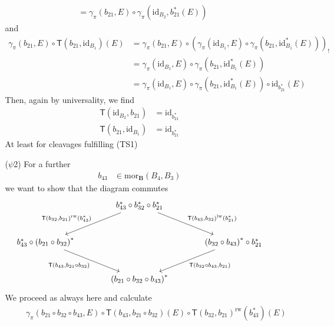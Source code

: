 \begin{enumerate}
\begin{enumerate}
\begin{align*}
  &=
  \gamma_{\pi}(b_{21},E)
  \circ
  \gamma_{\pi}(\mathrm{id}_{B_{2}},b_{21}^{\ast}(E))
\end{align*}
and
\begin{align*}
  \gamma_{\pi}(b_{21},E)
  \circ
  \mathsf{T}(b_{21},\mathrm{id}_{B_{1}})(E)
  &=
  \gamma_{\pi}(b_{21},E)
  \circ
  \left(
    \gamma_{\pi}(\mathrm{id}_{B_{1}},E)
    \circ
    \gamma_{\pi}(b_{21},\mathrm{id}_{B_{1}}^{\ast}(E))
  \right)_{!}
  \\
  &=
  \gamma_{\pi}(\mathrm{id}_{B_{1}},E)
  \circ
  \gamma_{\pi}(b_{21},\mathrm{id}_{B_{1}}^{\ast}(E))
  \\
  &=
  \gamma_{\pi}(\mathrm{id}_{B_{1}},E)
  \circ
  \gamma_{\pi}(b_{21},\mathrm{id}_{B_{1}}^{\ast}(E))
  \circ
  \mathrm{id}_{b_{21}^{\ast}}(E)
\end{align*}
Then, again by universality, we find
\begin{align*}
  \mathsf{T}(\mathrm{id}_{B_{2}},b_{21})
  &=
  \mathrm{id}_{b_{21}^{\ast}}
  \\
  \mathsf{T}(b_{21},\mathrm{id}_{B_{1}})
  &=
  \mathrm{id}_{b_{21}^{\ast}}
\end{align*}
At least for cleavages fulfilling (TS1)
\item[($\psi$2)]
For a further
\begin{align*}
  b_{43}
  &\in
  \mathrm{mor}_{\mathbf{B}}(B_{4},B_{3})
\end{align*}
we want to show that the diagram commutes
\[
\begin{tikzcd}[sep=large]
  &
  b_{43}^{\ast}
  \circ
  b_{32}^{\ast}
  \circ
  b_{21}^{\ast}
  \arrow{dr}{\mathsf{T}(b_{43},b_{32})^{\mathrm{lw}}(b_{21}^{\ast})}
  \arrow[swap]{dl}{\mathsf{T}(b_{32},b_{21})^{\mathrm{rw}}(b_{43}^{\ast})}
  &
  \\
  b_{43}^{\ast}
  \circ
  \left(
    b_{21}
    \circ
    b_{32}
  \right)^{\ast}
  \arrow[swap]{dr}{\mathsf{T}(b_{43},b_{21} \circ b_{32})}
  &
  &
  \left(
    b_{32}
    \circ
    b_{43}
  \right)^{\ast}
  \circ
  b_{21}^{\ast}
  \arrow{dl}{\mathsf{T}(b_{32} \circ b_{43},b_{21})}
  \\
  &
  \left(
    b_{21}
    \circ
    b_{32}
    \circ
    b_{43}
  \right)^{\ast}
\end{tikzcd}
\]
We proceed as always here and calculate
\begin{align*}
  &\phantom{=}
  \gamma_{\pi}(b_{21} \circ b_{32} \circ b_{43},E)
  \circ
  \mathsf{T}(b_{43},b_{21} \circ b_{32})(E)
  \circ
  \mathsf{T}(b_{32},b_{21})^{\mathrm{rw}}(b_{43}^{\ast})
  (E)
  \\

\end{align*}
\end{enumerate}
\end{enumerate}
